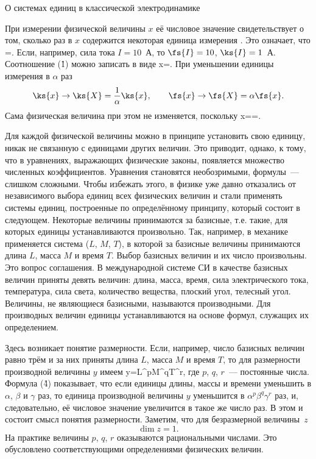 \vn О системах единиц в классической электродинамике

При измерении физической величины $x$ её числовое значение  свидетельствует о том, сколько раз в $x$ содержится
некоторая единица измерения . Это означает, что
=.
\ee
Если, например, сила тока $I=10$~А, то $\fs{I}=10$, $\ks{I}=1$~А. Соотношение (\r1) можно записать в виде
x=.
\ee
При уменьшении единицы измерения в $\alpha$ раз
\[
\ks{x}\rightarrow\ks{X}=\frac{1}{\alpha}\ks{x},\qquad\fs{x}\rightarrow\fs{X}=\alpha\fs{x}.
\]
Сама физическая величина при этом не изменяется, поскольку
x==.
\ee

Для каждой физической величины можно в принципе установить свою единицу, никак не связанную с единицами других величин.
Это приводит, однако, к тому, что в уравнениях, выражающих физические законы, появляется множество численных
коэффициентов. Уравнения становятся необозримыми, формулы~--- слишком сложными. Чтобы избежать этого, в физике уже давно
отказались от независимого выбора единиц всех физических величин и стали применять системы единиц, построенные по
определённому принципу, который состоит в следующем. Некоторые величины принимаются за базисные, т.е. такие, для которых
единицы устанавливаются произвольно. Так, например, в механике применяется система ($L$, $M$, $T$), в которой за базисные
величины принимаются длина $L$, масса $M$ и время $T$. Выбор базисных величин и их число произвольны. Это вопрос
соглашения. В международной системе СИ в качестве базисных величин приняты девять величин: длина, масса, время, сила
электрического тока, температура, сила света, количество вещества, плоский угол, телесный угол. Величины, не являющиеся
базисными, называются производными. Для производных величин единицы устанавливаются на основе формул, служащих их
определением.

Здесь возникает понятие размерности. Если, например, число базисных величин равно трём и за них приняты длина $L$, масса
$M$ и время $T$, то для размерности производной величины $y$ имеем
\dim y=L^p\cdot M^q\cdot T^r,
\ee
где $p$, $q$, $r$~--- постоянные числа. Формула (\r4) показывает, что если единицы длины, массы и времени уменьшить в
$\alpha$, $\beta$ и $\gamma$ раз, то единица производной величины $y$ уменьшится в $\alpha^p\beta^q\gamma^r$ раз, и,
следовательно, её числовое значение увеличится в такое же число раз. В этом и состоит смысл понятия размерности.
Заметим, что для безразмерной величины~$z$
\[
\dim z=1.
\]
На практике величины $p$, $q$, $r$ оказываются рациональными числами. Это обусловлено соответствующими определениями
физических величин.

